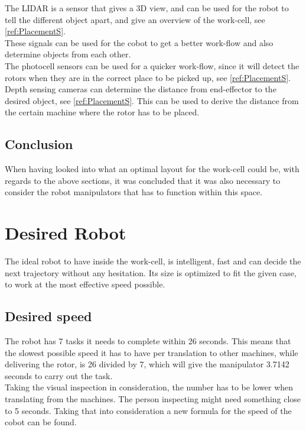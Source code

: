 The LIDAR is a sensor that gives a 3D view, and can be used for the robot to tell the different object apart, and give an overview of the work-cell, see \ref{ref:PlacementS}.\\
These signals can be used for the cobot to get a better work-flow and also determine objects from each other.\\

The photocell sensors can be used for a quicker work-flow, since it will detect the rotors when they are in the correct place to be picked up, see \ref{ref:PlacementS}.\\

Depth sensing cameras can determine the distance from end-effector to the desired object, see \ref{ref:PlacementS}. This can be used to derive the distance from the certain machine where the rotor has to be placed.\\

\subsection{Conclusion}

When having looked into what an optimal layout for the work-cell could be, with regards to the above sections, it was concluded that it was also necessary to consider the robot manipulators that has to function within this space. 

\section{Desired Robot}\label{IdealRobot}

The ideal robot to have inside the work-cell, is intelligent, fast and can decide the next trajectory without any hesitation. Its size is optimized to fit the given case, to work at the most effective speed possible.\\

\subsection{Desired speed}

The robot has 7 tasks it needs to complete within 26 seconds. This means that the slowest possible speed it has to have per translation to other machines, while delivering the rotor, is 26 divided by 7, which will give the manipulator 3.7142 seconds to carry out the task.\\
Taking the visual inspection in consideration, the number has to be lower when translating from the machines. The person inspecting might need something close to 5 seconds. Taking that into consideration a new formula for the speed of the cobot can be found.\\

